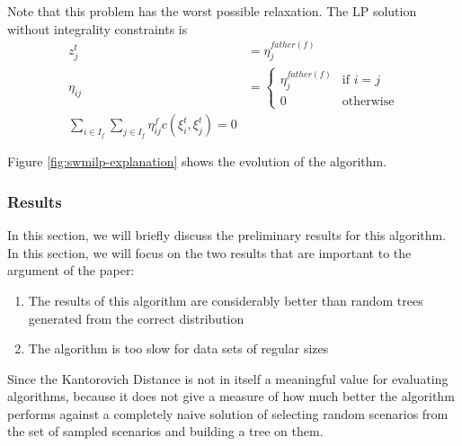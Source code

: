 Note that this problem has the worst possible relaxation. The LP solution without integrality constraints is
\begin{align}
  \label{eq:2}
  z_j^t &= \eta_j^{father(f)}\\
  \eta_{ij} &= \left\{
    \begin{array}{ll}
      \eta_j^{father(f)}&\text{if } i=j\\
      0&\text{otherwise}
    \end{array}
  \right.\\
  \sum_{i\in I_f}\sum_{j\in I_f}\eta_{ij}^fc(\xi_i^t,\xi_j^t) = 0
\end{align}

Figure \ref{fig:swmilp-explanation} shows the evolution of the algorithm.
\subsubsection{Results}
In this section, we will briefly discuss the preliminary results for this algorithm.
In this section, we will focus on the two results that are important to the argument of the paper:
\begin{enumerate}
\item The results of this algorithm are considerably better than random trees generated from the correct distribution
\item The algorithm is too slow for data sets of regular sizes
\end{enumerate}
Since the Kantorovich Distance is not in itself a meaningful value for evaluating algorithms, because it does not give a measure of how much better the algorithm performs against a completely naive solution of selecting random scenarios from the set of sampled scenarios and building a tree on them.


